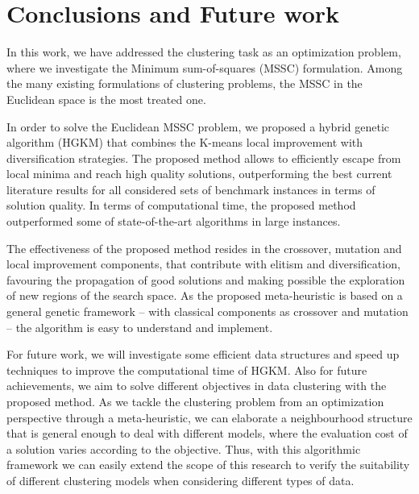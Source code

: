 \chapter{Conclusions and Future work}

In this work, we have addressed the clustering task as an optimization problem, where we investigate the Minimum sum-of-squares (MSSC) formulation. Among the many existing formulations of clustering problems, the MSSC in the Euclidean space is the most treated one.

In order to solve the Euclidean MSSC problem, we proposed a hybrid genetic algorithm (HGKM) that combines the K-means local improvement with diversification strategies. The proposed method allows to efficiently escape from local minima and reach high quality solutions, outperforming the best current literature results for all considered sets of benchmark instances in terms of solution quality. In terms of computational time, the proposed method outperformed some of state-of-the-art algorithms in large instances.

The effectiveness of the proposed method resides in the crossover, mutation and local improvement components, that contribute with elitism and diversification, favouring the propagation of good solutions and making possible the exploration of new regions of the search space. As the proposed meta-heuristic is based on a general genetic framework -- with classical components as crossover and mutation -- the algorithm is easy to understand and implement.

For future work, we will investigate some efficient data structures and speed up techniques to improve the computational time of HGKM. Also for future achievements, we aim to solve different objectives in data clustering with the proposed method. As we tackle the clustering problem from an optimization perspective through a meta-heuristic, we can elaborate a neighbourhood structure that is general enough to deal with different models, where the evaluation cost of a solution varies according to the objective. Thus, with this algorithmic framework we can easily extend the scope of this research to verify the suitability of different clustering models when considering different types of data.